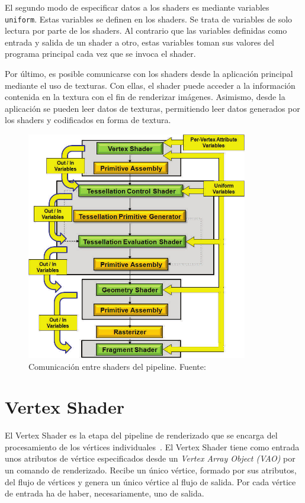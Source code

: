 El segundo modo de especificar datos a los shaders es mediante variables
\verb|uniform|. Estas variables se definen en los shaders. Se trata de variables
de solo lectura por parte de los shaders. Al contrario que las variables
definidas como entrada y salida de un shader a otro, estas variables toman sus
valores del programa principal cada vez que se invoca el shader.  

Por último, es posible comunicarse con los shaders desde la aplicación principal
mediante el uso de texturas. Con ellas, el shader puede acceder a la información
contenida en la textura con el fin de renderizar imágenes. Asimismo, desde la
aplicación se pueden leer datos de texturas, permitiendo leer datos generados
por los shaders y codificados en forma de textura.

\begin{figure}
		\centering
		\includegraphics[height=10cm]{figures/variablespipe.png}
		\caption[Comunicación entre shaders del pipeline.]{Comunicación entre
		shaders del pipeline. Fuente:~\cite{Bailey}}
		\label{fig3.1}
\end{figure}

\section{Vertex Shader}
\label{ref:Vertex}

El Vertex Shader es la etapa del pipeline de renderizado que se encarga del
procesamiento de los vértices individuales~\cite{VertexShader}. El Vertex Shader
tiene como entrada unos atributos de vértice especificados desde un
\textit{Vertex Array Object (VAO)} por un comando de renderizado. Recibe un
único vértice, formado por sus atributos, del flujo de vértices y genera un
único vértice al flujo de salida. Por cada vértice de entrada ha de haber,
necesariamente, uno de salida. 

